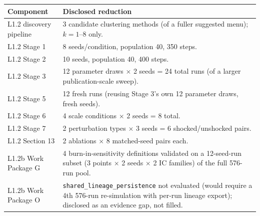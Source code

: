 \begin{tabular}{@{}lp{}@{}}
\toprule
\textbf{Component} & \textbf{Disclosed reduction} \\
\midrule
L1.2 discovery pipeline & 3 candidate clustering methods (of a fuller suggested menu); $k=1$--8 only. \\
L1.2 Stage 1 & 8 seeds/condition, population 40, 350 steps. \\
L1.2 Stage 2 & 10 seeds, population 40, 400 steps. \\
L1.2 Stage 3 & 12 parameter draws $\times$ 2 seeds = 24 total runs (of a larger publication-scale sweep). \\
L1.2 Stage 5 & 12 fresh runs (reusing Stage 3's own 12 parameter draws, fresh seeds). \\
L1.2 Stage 6 & 4 scale conditions $\times$ 2 seeds = 8 total. \\
L1.2 Stage 7 & 2 perturbation types $\times$ 3 seeds = 6 shocked/unshocked pairs. \\
L1.2 Section 13 & 2 ablations $\times$ 8 matched-seed pairs each. \\
L1.2b Work Package G & 4 burn-in-sensitivity definitions validated on a 12-seed-run subset (3 points $\times$ 2 seeds $\times$ 2 IC families) of the full 576-run pool. \\
L1.2b Work Package O & \texttt{shared\_lineage\_persistence} not evaluated (would require a 4th 576-run re-simulation with per-run lineage export); disclosed as an evidence gap, not filled. \\
\bottomrule
\end{tabular}

